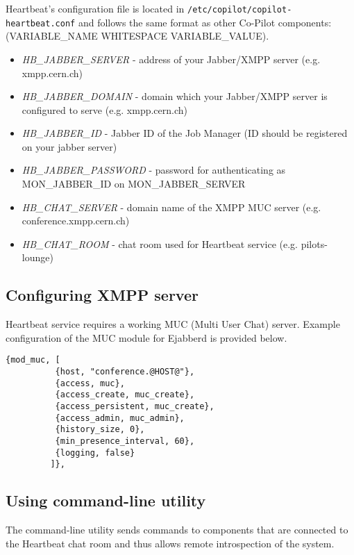 Heartbeat's configuration file is located in \texttt{/etc/copilot/copilot-heartbeat.conf} and follows the same format as other Co-Pilot components: (VARIABLE\_NAME WHITESPACE VARIABLE\_VALUE).

\begin{itemize}
  \item \emph{HB\_JABBER\_SERVER} - address of your Jabber/XMPP server (e.g. xmpp.cern.ch)
  \item \emph{HB\_JABBER\_DOMAIN} - domain which your Jabber/XMPP server is configured to serve (e.g. xmpp.cern.ch)
  \item \emph{HB\_JABBER\_ID} - Jabber ID of the Job Manager (ID should be registered on your jabber server)
  \item \emph{HB\_JABBER\_PASSWORD} - password for authenticating as MON\_JABBER\_ID on MON\_JABBER\_SERVER
  \item \emph{HB\_CHAT\_SERVER} - domain name of the XMPP MUC server (e.g. conference.xmpp.cern.ch)
  \item \emph{HB\_CHAT\_ROOM} - chat room used for Heartbeat service (e.g. pilots-lounge)
\end{itemize}

\subsection{Configuring XMPP server}

\copilot Heartbeat service requires a working MUC (Multi User Chat) server. Example configuration of the MUC module for Ejabberd is provided below.

\lstset{caption=Example configuration of MUC module}
\begin{lstlisting}
{mod_muc, [
          {host, "conference.@HOST@"},
          {access, muc},
          {access_create, muc_create},
          {access_persistent, muc_create},
          {access_admin, muc_admin},
          {history_size, 0},
          {min_presence_interval, 60},
          {logging, false}
         ]},
\end{lstlisting}

\subsection{Using command-line utility}
\label{sct:heartbeatcmd}

The command-line utility sends commands to components that are connected to the Heartbeat chat room and thus allows remote introspection
of the system.

